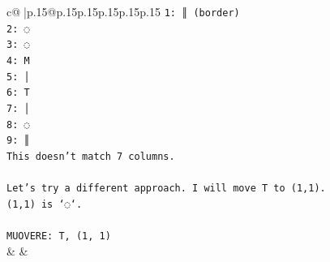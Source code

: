 \documentclass{article}
\begin{document}
{\begin{supertabular}{c@{$\;$}|p{.15\linewidth}@{}p{.15\linewidth}p{.15\linewidth}p{.15\linewidth}p{.15\linewidth}p{.15\linewidth}}
{{{\texttt{1: ║ (border)} \\
\texttt{2: ◌} \\
\texttt{3: ◌} \\
\texttt{4: M} \\
\texttt{5: │} \\
\texttt{6: T} \\
\texttt{7: │} \\
\texttt{8: ◌} \\
\texttt{9: ║} \\
\texttt{This doesn't match 7 columns.} \\
\\ 
\texttt{Let's try a different approach. I will move T to (1,1).} \\
\texttt{(1,1) is `◌`.} \\
\\ 
\texttt{MUOVERE: T, (1, 1)} \\
            }
        }
    }
    & & \\ \\


\end{supertabular}}
\end{document}
